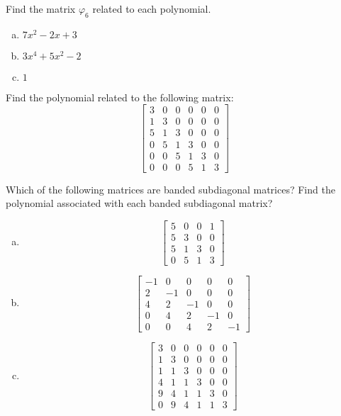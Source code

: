 \begin{exercise}{}
Find the matrix $\varphi_6$ related to each polynomial.
\begin{enumerate}[(a)]
\item
$7x^2 - 2x + 3$
\item
$3x^4 + 5x^2 - 2$
\item
$1$
\end{enumerate}
\end{exercise}
\begin{exercise}{}
Find the polynomial related to the following matrix:
\[\left[\begin{array}{cccccc}3 & 0 & 0 & 0 & 0 & 0\\1 & 3 & 0 & 0 & 0 & 0\\5 & 1 & 3 & 0 & 0 & 0\\0 & 5 & 1 & 3 & 0 & 0\\0 & 0 & 5 & 1 & 3 & 0\\0 & 0 & 0 & 5 & 1 & 3\end{array}\right]\]
\end{exercise}

\begin{exercise}{}
Which of the following matrices are banded subdiagonal matrices? Find the polynomial associated with each banded subdiagonal matrix?
\begin{enumerate}[(a)]
	\item
\[\left[\begin{array}{cccc}5 & 0 & 0 & 1\\5 & 3 & 0 & 0\\5 & 1 & 3 & 0\\0 & 5 & 1 & 3\end{array}\right]\]	
	\item
\[\left[\begin{array}{ccccc}-1 & 0 & 0 & 0 & 0\\2 & -1 & 0 & 0 & 0\\4 & 2 & -1 & 0 & 0\\0 & 4 & 2 & -1 & 0\\0 & 0 & 4 & 2 & -1\end{array}\right]\]
\item
\[\left[\begin{array}{cccccc}3 & 0 & 0 & 0 & 0 & 0\\1 & 3 & 0 & 0 & 0 & 0\\1 & 1 & 3 & 0 & 0 & 0\\4 & 1 & 1 & 3 & 0 & 0\\9 & 4 & 1 & 1 & 3 & 0\\0 & 9 & 4 & 1 & 1 & 3\end{array}\right]\]
\end{enumerate}
\end{exercise}

